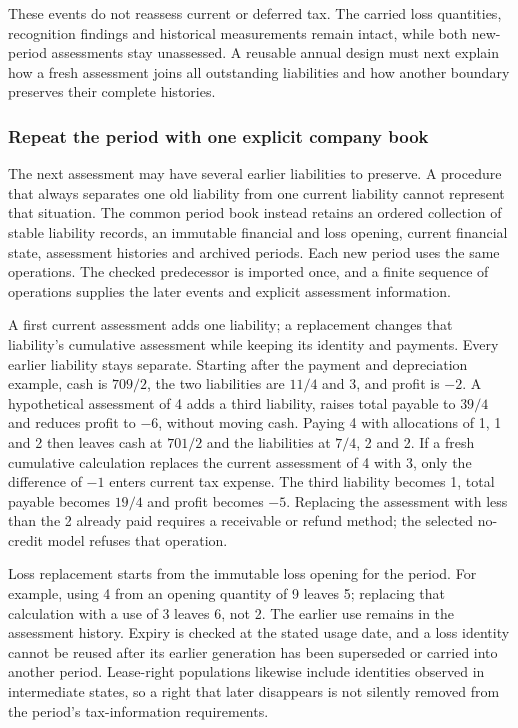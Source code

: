 These events do not reassess current or deferred tax. The carried loss
quantities, recognition findings and historical measurements remain intact,
while both new-period assessments stay unassessed. A reusable annual design
must next explain how a fresh assessment joins all outstanding liabilities and
how another boundary preserves their complete histories.

\subsubsection*{Repeat the period with one explicit company book}
The next assessment may have several earlier liabilities to preserve. A
procedure that always separates one old liability from one current liability
cannot represent that situation. The common period book instead retains an
ordered collection of stable liability records, an immutable financial and
loss opening, current financial state, assessment histories and archived
periods. Each new period uses the same operations. The checked predecessor is
imported once, and a finite sequence of operations supplies the later events
and explicit assessment information.

A first current assessment adds one liability; a replacement changes that
liability's cumulative assessment while keeping its identity and payments.
Every earlier liability stays separate. Starting after the payment and
depreciation example, cash is $709/2$, the two liabilities are $11/4$ and 3,
and profit is $-2$. A hypothetical assessment of 4 adds a third liability,
raises total payable to $39/4$ and reduces profit to $-6$, without moving cash.
Paying 4 with allocations of 1, 1 and 2 then leaves cash at $701/2$ and the
liabilities at $7/4$, 2 and 2. If a fresh cumulative calculation replaces
the current assessment of 4 with 3, only the difference of $-1$ enters current
tax expense. The third liability becomes 1, total payable becomes $19/4$
and profit becomes $-5$. Replacing the assessment with less than the 2 already
paid requires a receivable or refund method; the selected no-credit model
refuses that operation.

Loss replacement starts from the immutable loss opening for the period. For
example, using 4 from an opening quantity of 9 leaves 5; replacing that
calculation with a use of 3 leaves 6, not 2. The earlier use remains in the
assessment history. Expiry is checked at the stated usage date, and a loss
identity cannot be reused after its earlier generation has been superseded
or carried into another period. Lease-right populations likewise include
identities observed in intermediate states, so a right that later disappears
is not silently removed from the period's tax-information requirements.

